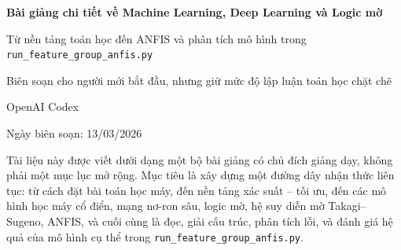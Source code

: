 \documentclass[12pt,a4paper,openany]{book}
\theoremstyle{definition}
\theoremstyle{plain}
\begin{document}
\frontmatter

\begin{titlepage}
    \centering
    {\Huge\bfseries Bài giảng chi tiết về Machine Learning, Deep Learning và Logic mờ\par}
    \vspace{1.5cm}
    {\Large Từ nền tảng toán học đến ANFIS và phân tích mô hình trong \texttt{run\_feature\_group\_anfis.py}\par}
    \vspace{1.8cm}
    {\large Biên soạn cho người mới bắt đầu, nhưng giữ mức độ lập luận toán học chặt chẽ\par}
    \vfill
    {\large OpenAI Codex\par}
    {\large Ngày biên soạn: 13/03/2026\par}
    \vfill
    \begin{minipage}{0.88\textwidth}
    Tài liệu này được viết dưới dạng một bộ bài giảng có chủ đích giảng dạy, không phải một mục lục mở rộng. Mục tiêu là xây dựng một đường dây nhận thức liên tục: từ cách đặt bài toán học máy, đến nền tảng xác suất -- tối ưu, đến các mô hình học máy cổ điển, mạng nơ-ron sâu, logic mờ, hệ suy diễn mờ Takagi--Sugeno, ANFIS, và cuối cùng là đọc, giải cấu trúc, phân tích lỗi, và đánh giá hệ quả của mô hình cụ thể trong \texttt{run\_feature\_group\_anfis.py}.
    \end{minipage}
\end{titlepage}



\tableofcontents

\mainmatter
















\backmatter


\end{document}
